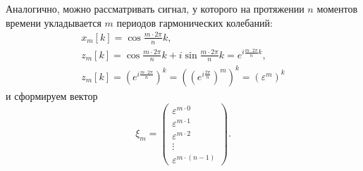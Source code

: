 Аналогично, можно рассматривать сигнал, у которого на протяжении $n$ моментов времени укладывается $m$ периодов гармонических колебаний:
\begin{gather*}
    x_m[k]
    = \cos \frac{m \cdot 2 \pi}{n} k , \\
    z_m[k]
    = \cos \frac{m \cdot 2 \pi}{n} k + i \sin \frac{m \cdot 2 \pi}{n} k
    = e^{i \frac{m \cdot 2 \pi}{n} k}, \\
    z_m[k]
    = \left( e^{i \frac{m \cdot 2 \pi}{n}} \right)^k
    = \left( \left( e^{i \frac{2 \pi}{n}} \right)^m \right)^k
    = \left( \varepsilon^m \right)^k
\end{gather*}
и сформируем вектор
\[
    \xi_m
    = \begin{pmatrix}
          \varepsilon^{m \cdot 0} \\
          \varepsilon^{m \cdot 1} \\
          \varepsilon^{m \cdot 2} \\
          \vdots                  \\
          \varepsilon^{m \cdot (n-1)}
    \end{pmatrix} .
\]

